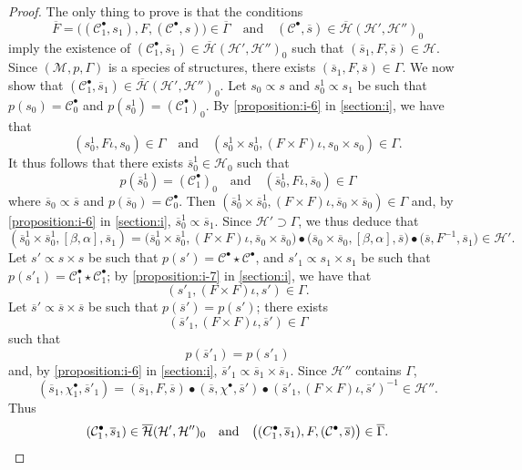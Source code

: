 \documentclass[a4paper,fleqn]{article}
\theoremstyle{plain}
\theoremstyle{definition}
\newcommand{\textand}{\quad\text{and}\quad}
\newcommand{\CC}{\mathcal{C}}
\newcommand{\HH}{\mathcal{H}}
\newcommand{\bHH}{\overline{\HH}}
\newcommand{\MM}{\mathcal{M}}
\newcommand{\subs}{\mathrel{\propto}}
\newcommand{\smallbullet}{\bullet}
\begin{document}
\begin{proof}
  The only thing to prove is that the conditions
  \[
    \overline{F}
    = \big((\CC_1^\smallbullet,s_1),F,(\CC^\smallbullet,s)\big)
    \in\overline{\Gamma}
    \textand
    (\CC^\smallbullet,\overline{s})
    \in\bHH(\HH',\HH'')_0
  \]
  imply the existence of $(\CC_1^\smallbullet,\overline{s}_1)\in\bHH(\HH',\HH'')_0$ such that $(\overline{s}_1,F,\overline{s})\in\HH$.
  Since $(\MM,p,\Gamma)$ is a species of structures, there exists $(\overline{s}_1,F,\overline{s})\in\Gamma$.
  We now show that $(\CC_1^\smallbullet,\overline{s}_1)\in\bHH(\HH',\HH'')_0$.
  Let $s_0\subs s$ and $s_0^1\subs s_1$ be such that $p(s_0)=\CC_0^\smallbullet$ and $p(s_0^1)=(\CC_1^\smallbullet)_0$.
  By \cref{proposition:i-6} in \cref{section:i}, we have that
  \[
    (s_0^1,F\iota,s_0)
    \in\Gamma
    \textand
    (s_0^1\times s_0^1,(F\times F)\iota,s_0\times s_0)
    \in\Gamma.
  \]
  It thus follows that there exists $\overline{s}_0^1\in\HH_0$ such that
  \[
    p(\overline{s}_0^1)
    = (\CC_1^\smallbullet)_0
    \textand
    (\overline{s}_0^1,F\iota,\overline{s}_0)
    \in\Gamma
  \]
  where $\overline{s}_0\subs\overline{s}$ and $p(\overline{s}_0)=\CC_0^\smallbullet$.
  Then $(\overline{s}_0^1\times\overline{s}_0^1,(F\times F)\iota,\overline{s}_0\times\overline{s}_0)\in\Gamma$ and, by \cref{proposition:i-6} in \cref{section:i}, $\overline{s}_0^1\subs\overline{s}_1$.
  Since $\HH'\supset\Gamma$, we thus deduce that
  \[
    (\overline{s}_0^1\times\overline{s}_0^1,[\beta,\alpha],\overline{s}_1)
    = \big(
      \overline{s}_0^1\times\overline{s}_0^1, (F\times F)\iota, \overline{s}_0\times\overline{s}_0
    \big)
    \smallbullet \big(
      \overline{s}_0\times\overline{s}_0, [\beta,\alpha], \overline{s}
    \big)
    \smallbullet \big(
      \overline{s}, F^{-1}, \overline{s}_1
    \big)
    \in \HH'.
  \]
  Let $s'\subs s\times s$ be such that $p(s')=\CC^\smallbullet\star\CC^\smallbullet$, and $s'_1\subs s_1\times s_1$ be such that $p(s'_1)=\CC_1^\smallbullet\star\CC_1^\smallbullet$;
  by \cref{proposition:i-7} in \cref{section:i}, we have that
  \[
    (s'_1,(F\times F)\iota,s')
    \in\Gamma.
  \]
  Let $\overline{s}'\subs\overline{s}\times\overline{s}$ be such that $p(\overline{s}')=p(s')$;
  there exists
  \[
    (\overline{s}'_1,(F\times F)\iota,\overline{s}')
    \in\Gamma
  \]
  such that
  \[
    p(\overline{s}'_1)
    = p(s'_1)
  \]
  and, by \cref{proposition:i-6} in \cref{section:i}, $\overline{s}'_1\subs\overline{s}_1\times\overline{s}_1$.
  Since $\HH''$ contains $\Gamma$,
  \[
    (\overline{s}_1,\chi_1^\smallbullet,\overline{s}'_1)
    = (\overline{s}_1,F,\overline{s})
    \smallbullet (\overline{s},\chi^\smallbullet,\overline{s}')
    \smallbullet(\overline{s}'_1,(F\times F)\iota,\overline{s}')^{-1}
    \in\HH''.
  \]
  Thus
  \[
    (\CC_1^\smallbullet,\overline{s}_1)
    \in\bHH(\HH',\HH'')_0
    \textand
    \big(
      (C_1^\smallbullet,\overline{s}_1), F, (\CC^\smallbullet,\overline{s})
    \big)
    \in\overline{\Gamma}.
    \qedhere
  \]
\end{proof}
\end{document}
